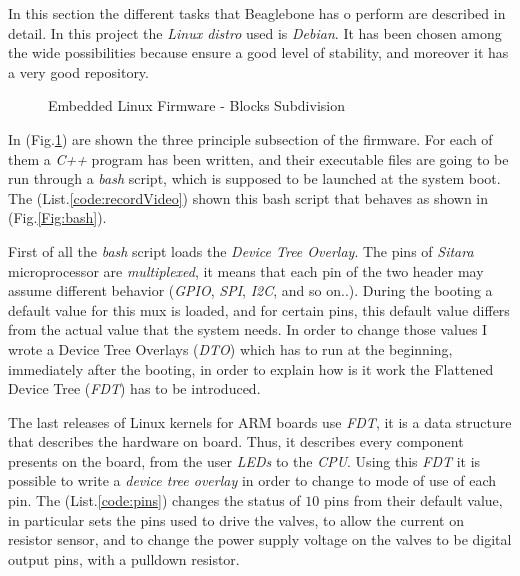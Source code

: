 In this section the different tasks that Beaglebone has o perform are described in detail. In this project the \textit{Linux distro} used is \textit{Debian}. It has been chosen among the wide possibilities because ensure a good level of stability, and moreover it has a very good repository. 

\begin{figure}[h]
	\centering
	\caption{Embedded Linux Firmware - Blocks Subdivision}
	\label{Fig:firmware}
\end{figure}

In (Fig.\ref{Fig:firmware}) are shown the three principle subsection of the firmware. For each of them a \textit{C++} program has been written, and their executable files are going to be run through a \textit{bash} script, which is supposed to be launched at the system boot. The (List.\ref{code:recordVideo}) shown this bash script that behaves as shown in (Fig.\ref{Fig:bash}).

First of all the \textit{bash} script loads the \textit{Device Tree Overlay}. The pins of \textit{Sitara\texttrademark} microprocessor are \textit{multiplexed}, it means that each pin of the two header may assume different behavior (\textit{GPIO}, \textit{SPI}, \textit{I2C}, and so on..). During the booting a default value for this mux is loaded, and for certain pins, this default value differs from the actual value that the system needs. In order to change those values I wrote a Device Tree Overlays (\textit{DTO}) which has to run at the beginning, immediately after the booting, in order to explain how is it work the Flattened Device Tree (\textit{FDT}) has to be introduced.

The last releases of Linux kernels for ARM boards use \textit{FDT}, it is a data structure that describes the hardware on board. Thus, it describes every component presents on the board, from the user \textit{LEDs} to the \textit{CPU}. Using this \textit{FDT} it is possible to write a \textit{device tree overlay} in order to change to mode of use of each pin. The (List.\ref{code:pins}) changes the status of $10$ pins from their default value, in particular sets the pins used to drive the valves, to allow the current on resistor sensor, and to change the power supply voltage on the valves to be digital output pins, with a pulldown resistor.

